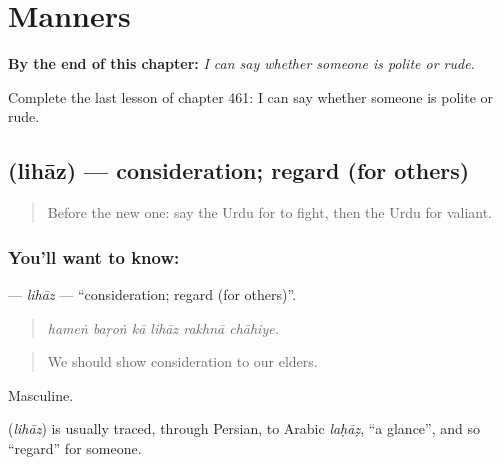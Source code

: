 
\chapter{Manners}
\label{ch:ur-manners}

\begin{chapteropening}
\textbf{By the end of this chapter:} \emph{I can say whether someone is polite or rude.}

Complete the last lesson of chapter 461: I can say whether someone is polite or rude.
\end{chapteropening}

\section[\texorpdfstring{\ur{لحاظ} (lihāz)}{لحاظ (lihāz)}]{ (lihāz) — consideration; regard (for others)}

\label{lesson:UR-C461-lihaz}



\begin{quote}
Before the new one: say the Urdu for to fight, then the Urdu for valiant.
\end{quote}

\subsection*{You'll want to know: }
\textbf{} — \emph{lihāz} — \textquotedblleft{}consideration; regard (for others)\textquotedblright{}.

\begin{quote}
     
\end{quote}

\begin{quote}
\emph{hameṅ baṛoṅ kā lihāz rakhnā chāhiye.}
\end{quote}

\begin{quote}
We should show consideration to our elders.
\end{quote}

Masculine.

\begin{cousinweb}
\textbf{} (\emph{lihāz}) is usually traced, through Persian, to Arabic \emph{laḥāẓ}, \textquotedblleft{}a glance\textquotedblright{}, and so \textquotedblleft{}regard\textquotedblright{} for someone.
\end{cousinweb}

